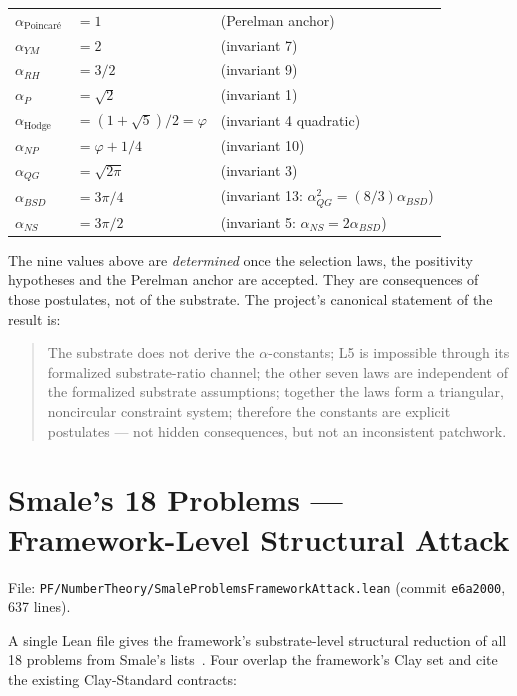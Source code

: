 \begin{center}
\begin{tabular}{lll}
$\alpha_{\text{Poincar\'e}}$ & $= 1$                & (Perelman anchor) \\
$\alpha_{YM}$                & $= 2$                & (invariant 7) \\
$\alpha_{RH}$                & $= 3/2$              & (invariant 9) \\
$\alpha_P$                   & $= \sqrt{2}$         & (invariant 1) \\
$\alpha_{\text{Hodge}}$      & $= (1 + \sqrt{5})/2 = \varphi$ & (invariant 4 quadratic) \\
$\alpha_{NP}$                & $= \varphi + 1/4$    & (invariant 10) \\
$\alpha_{QG}$                & $= \sqrt{2\pi}$      & (invariant 3) \\
$\alpha_{BSD}$               & $= 3\pi/4$           & (invariant 13: $\alpha_{QG}^2 = (8/3)\alpha_{BSD}$) \\
$\alpha_{NS}$                & $= 3\pi/2$           & (invariant 5: $\alpha_{NS} = 2\alpha_{BSD}$)
\end{tabular}
\end{center}

\noindent The nine values above are \emph{determined} once the
selection laws, the positivity hypotheses and the Perelman anchor are accepted.
They are consequences of those postulates, not of the
substrate.
The project's canonical statement of the result is:

\begin{quote}
The substrate does not derive the $\alpha$-constants; L5 is impossible through
its formalized substrate-ratio channel; the other seven laws are independent of
the formalized substrate assumptions; together the laws form a triangular,
noncircular constraint system; therefore the constants are explicit postulates
--- not hidden consequences, but not an inconsistent patchwork.
\end{quote}

\section{Smale's 18 Problems --- Framework-Level Structural Attack}
\label{sec:refinement-smale}

File: \texttt{PF/NumberTheory/SmaleProblemsFrameworkAttack.lean}
(commit \texttt{e6a2000}, 637 lines).

A single Lean file gives the framework's substrate-level structural
reduction of all 18 problems from Smale's lists~\cite{smale1998mathintelligencer,smale2000frontiers}.
Four overlap the framework's Clay set and cite the existing
Clay-Standard contracts:

